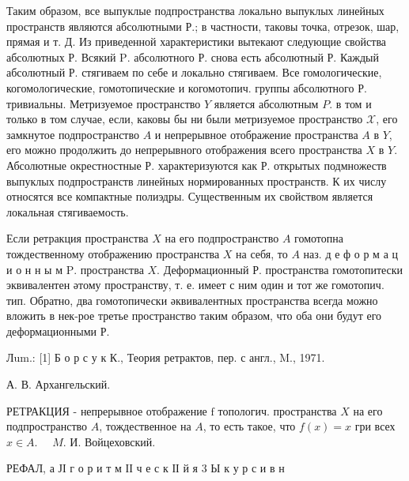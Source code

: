 \documentclass[10pt]{article}
\begin{document}
Таким образом, все выпуклые подпространства локально выпуклых линейных пространств являются абсолютными Р.; в частности, таковы точка, отрезок, шар, прямая и т. Д. Из приведенной характеристики вытекают следующие свойства абсолютных Р. Всякий $\mathrm{P}$. абсолютного Р. снова есть абсолютный Р. Каждый абсолютный Р. стягиваем по себе и локально стягиваем. Все гомологические, когомологические, гомотопические и когомотопич. группы абсолютного Р. тривиальны. Метризуемое пространство $Y$ является абсолютным $P$. в том и только в том случае, если, каковы бы ни были метризуемое пространство $\mathscr{X}$, его замкнутое подпространство $A$ и непрерывное отображение пространства $A$ в $Y$, его можно продолжить до непрерывного отображения всего пространства $X$ в $Y$. Абсолютные окрестностные Р. характеризуются как Р. открытых подмножеств выпуклых подпространств линейных нормированных пространств. К их числу относятся все компактные полиэдры. Существенным их свойством является локальная стягиваемость.



Если ретракция пространства $X$ на его подпространство $A$ гомотопна тождественному отображению пространства $X$ на себя, то $A$ наз. д е ф о р м а ц и о н н ы м $\mathrm{P}$. пространства $X$. Деформационный Р. пространства гомотопитески эквивалентен әтому пространству, т. е. имеет с ним один и тот же гомотопич. тип. Обратно, два гомотопически әквивалентных пространства всегда можно вложить в нек-рое третье пространство таким образом, что оба они будут его деформационными Р.



Лum.: [1] Б о р с у к К., Теория ретрактов, пер. с англ., M., 1971.



А. В. Архангельский.



РЕТРАКЦИЯ - непрерывное отображение $\mathrm{f}$ топологич. пространства $X$ на его подпространство $A$, тождественное на $A$, то есть такое, что $f(x)=x$ гри всех $x \in A$. $\quad M$. И. Войцеховский.



РЕФАЛ, а ЈІ г о р и т м ІІ ч е с к ІІ й я 3 Ы к у р с и в н
\end{document}
